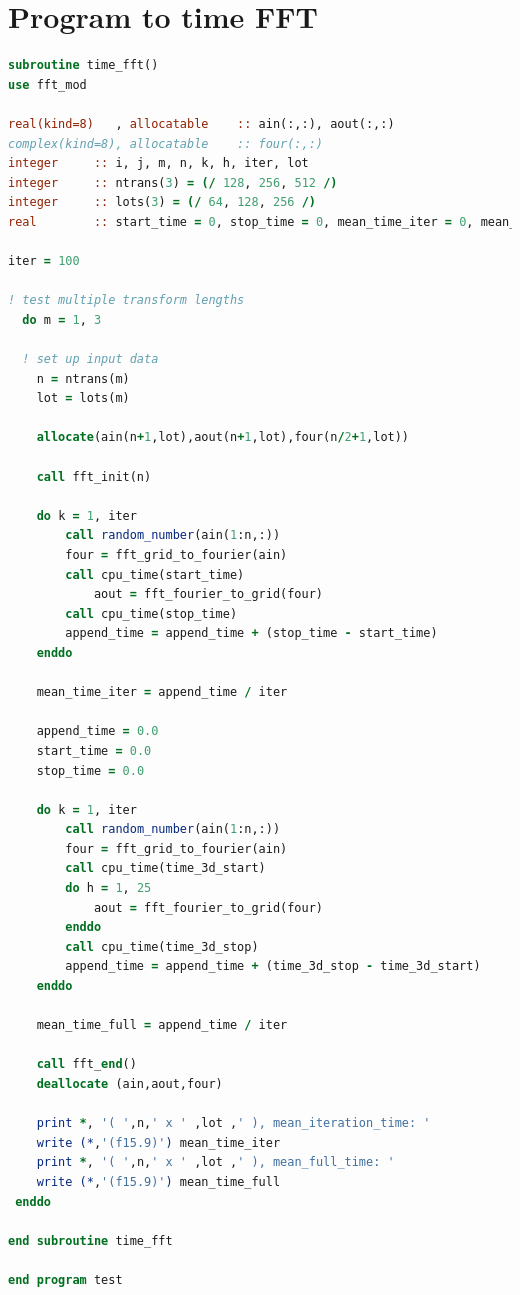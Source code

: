 \documentclass[a4paper,11pt]{report}
\begin{document}
\section*{Program to time FFT}
\begin{lstlisting}[language=Fortran]
subroutine time_fft()
use fft_mod

real(kind=8)   , allocatable 	:: ain(:,:), aout(:,:)
complex(kind=8), allocatable 	:: four(:,:)
integer 	:: i, j, m, n, k, h, iter, lot
integer 	:: ntrans(3) = (/ 128, 256, 512 /)
integer 	:: lots(3) = (/ 64, 128, 256 /)
real 	    :: start_time = 0, stop_time = 0, mean_time_iter = 0, mean_time_full = 0, append_time = 0, time_3d_start = 0, time_3d_stop = 0

iter = 100

! test multiple transform lengths
  do m = 1, 3

  ! set up input data
    n = ntrans(m)
    lot = lots(m)

    allocate(ain(n+1,lot),aout(n+1,lot),four(n/2+1,lot))

    call fft_init(n)

    do k = 1, iter
        call random_number(ain(1:n,:))
        four = fft_grid_to_fourier(ain)
        call cpu_time(start_time)
            aout = fft_fourier_to_grid(four)
        call cpu_time(stop_time)
        append_time = append_time + (stop_time - start_time)
    enddo

    mean_time_iter = append_time / iter

    append_time = 0.0
    start_time = 0.0
    stop_time = 0.0

    do k = 1, iter
        call random_number(ain(1:n,:))
        four = fft_grid_to_fourier(ain)
        call cpu_time(time_3d_start)
        do h = 1, 25
            aout = fft_fourier_to_grid(four)
        enddo
        call cpu_time(time_3d_stop)
        append_time = append_time + (time_3d_stop - time_3d_start)
    enddo

    mean_time_full = append_time / iter

    call fft_end()
    deallocate (ain,aout,four)

    print *, '( ',n,' x ' ,lot ,' ), mean_iteration_time: '
    write (*,'(f15.9)') mean_time_iter
    print *, '( ',n,' x ' ,lot ,' ), mean_full_time: '
    write (*,'(f15.9)') mean_time_full
 enddo

end subroutine time_fft

end program test
\end{lstlisting}
\end{document}
